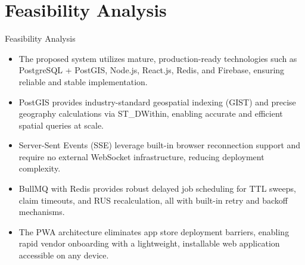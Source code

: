 \documentclass[aspectratio=169,xcolor=dvipsnames]{beamer}
\begin{document}
\section{Feasibility Analysis}
\begin{frame}{Feasibility Analysis}
\justifying
\begin{itemize}
    \item The proposed system utilizes mature, production-ready technologies such as PostgreSQL + PostGIS, Node.js, React.js, Redis, and Firebase, ensuring reliable and stable implementation.
    
    \item PostGIS provides industry-standard geospatial indexing (GIST) and precise geography calculations via ST\_DWithin, enabling accurate and efficient spatial queries at scale.
    
    \item Server-Sent Events (SSE) leverage built-in browser reconnection support and require no external WebSocket infrastructure, reducing deployment complexity.
    
    \item BullMQ with Redis provides robust delayed job scheduling for TTL sweeps, claim timeouts, and RUS recalculation, all with built-in retry and backoff mechanisms.
    
    \item The PWA architecture eliminates app store deployment barriers, enabling rapid vendor onboarding with a lightweight, installable web application accessible on any device.
\end{itemize}
\end{frame}

\end{document}
